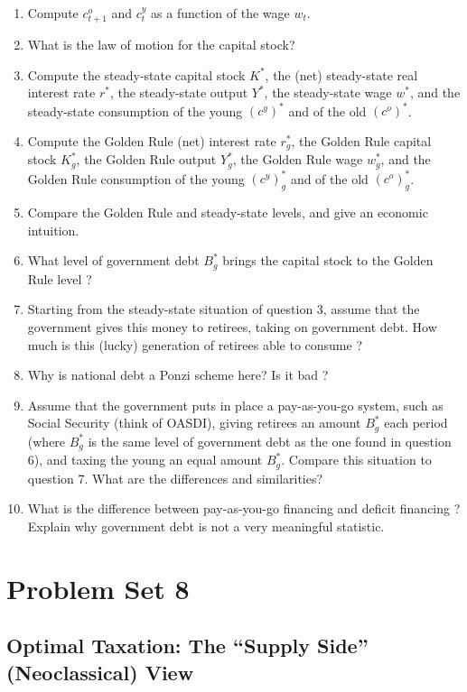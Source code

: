 \documentclass[]{book}
\theoremstyle{definition}
\theoremstyle{definition}
\theoremstyle{definition}
\theoremstyle{remark}
\begin{document}
\begin{enumerate}
\def\labelenumi{\arabic{enumi}.}
\item
  Compute \(c_{t+1}^o\) and \(c_t^y\) as a function of the wage \(w_t\).
\item
  What is the law of motion for the capital stock?
\item
  Compute the steady-state capital stock \(K^{*}\), the (net)
  steady-state real interest rate \(r^{*}\), the steady-state output
  \(Y^{*}\), the steady-state wage \(w^{*}\), and the steady-state
  consumption of the young \((c^y)^{*}\) and of the old \((c^o)^{*}\).
\item
  Compute the Golden Rule (net) interest rate \(r^{*}_g\), the Golden
  Rule capital stock \(K^{*}_g\), the Golden Rule output \(Y^{*}_g\),
  the Golden Rule wage \(w^{*}_g\), and the Golden Rule consumption of
  the young \((c^y)^{*}_g\) and of the old \((c^o)^{*}_g\).
\item
  Compare the Golden Rule and steady-state levels, and give an economic
  intuition.
\item
  What level of government debt \(B^{*}_g\) brings the capital stock to
  the Golden Rule level ?
\item
  Starting from the steady-state situation of question 3, assume that
  the government gives this money to retirees, taking on government
  debt. How much is this (lucky) generation of retirees able to consume
  ?
\item
  Why is national debt a Ponzi scheme here? Is it bad ?
\item
  Assume that the government puts in place a pay-as-you-go system, such
  as Social Security (think of OASDI), giving retirees an amount
  \(B^{*}_g\) each period (where \(B^{*}_g\) is the same level of
  government debt as the one found in question 6), and taxing the young
  an equal amount \(B^{*}_g\). Compare this situation to question 7.
  What are the differences and similarities?
\item
  What is the difference between pay-as-you-go financing and deficit
  financing ? Explain why government debt is not a very meaningful
  statistic.
\end{enumerate}

\hypertarget{pset8}{\chapter{Problem Set 8}\label{pset8}}

\section{\texorpdfstring{Optimal Taxation: The ``Supply Side''
(Neoclassical)
View}{Optimal Taxation: The Supply Side (Neoclassical) View}}\label{optimal-taxation-the-supply-side-neoclassical-view}
\end{document}
